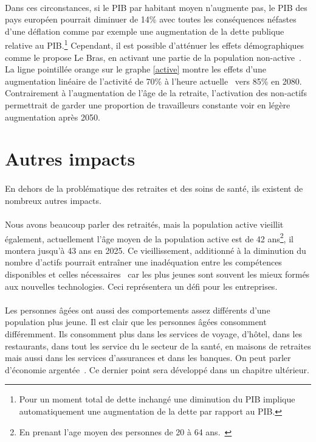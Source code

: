 \paragraph{}Dans ces circonstances, si le PIB par habitant moyen n’augmente pas, le PIB des pays européen pourrait diminuer de 14\% avec toutes les conséquences néfastes d’une déflation comme par exemple une augmentation de la dette publique relative au PIB.\footnote{Pour un moment total de dette inchangé une diminution du PIB implique automatiquement une augmentation de la dette par rapport au PIB.} Cependant, il est possible d’atténuer les effets démographiques comme le propose Le Bras, en activant une partie de la population non-active~\citep[pp.36]{heran}. La ligne pointillée orange sur le graphe \ref{active} montre les effets d’une augmentation linéaire de l’activité de 70\% à l’heure actuelle~\citep{eurostat_emploi} vers 85\% en 2080. Contrairement à l’augmentation de l’âge de la retraite, l’activation des non-actifs permettrait de garder une proportion de travailleurs constante voir en légère augmentation après 2050. 

\section{Autres impacts}
\paragraph{}En dehors de la problématique des retraites et des soins de santé, ils existent de nombreux autres impacts. 

\paragraph{}Nous avons beaucoup parler des retraités, mais la population active vieillit également, actuellement l’âge moyen de la population active est de 42 ans\footnote{ En prenant l’age moyen des personnes de 20 à 64 ans.~\citep{eurostat_europop13}}, il montera jusqu’à 43 ans en 2025. Ce vieillissement, additionné à la diminution du nombre d’actifs pourrait entraîner une inadéquation entre les compétences disponibles et celles nécessaires~\citep[pp.10]{thesis} car les plus jeunes sont souvent les mieux formés aux nouvelles technologies. Ceci représentera un défi pour les entreprises. 

\paragraph{}Les personnes âgées ont aussi des comportements assez différents d’une population plus jeune. Il est clair que les personnes âgées consomment différemment. Ils consomment plus dans les services de voyage, d’hôtel, dans les restaurants, dans tout les service du le secteur de la santé, en maisons de retraites mais aussi dans les services d'assurances et dans les banques. On peut parler d'économie argentée~\citep[pp.11]{thesis}. Ce dernier point sera développé dans un chapitre ultérieur.  

